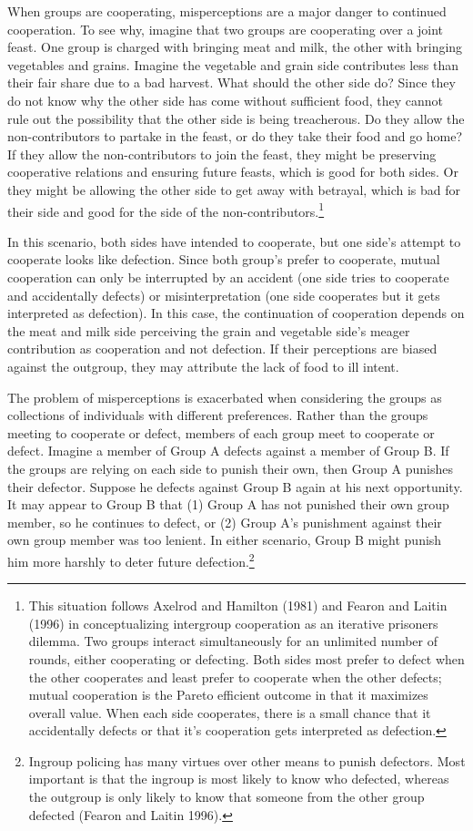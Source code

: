 \documentclass[11pt]{article}
\begin{document}
When groups are cooperating, misperceptions are a major danger to
continued cooperation. To see why, imagine that two groups are
cooperating over a joint feast. One group is charged with bringing meat
and milk, the other with bringing vegetables and grains. Imagine the
vegetable and grain side contributes less than their fair share due to a
bad harvest. What should the other side do? Since they do not know why
the other side has come without sufficient food, they cannot rule out
the possibility that the other side is being treacherous. Do they allow
the non-contributors to partake in the feast, or do they take their food
and go home? If they allow the non-contributors to join the feast, they
might be preserving cooperative relations and ensuring future feasts,
which is good for both sides. Or they might be allowing the other side
to get away with betrayal, which is bad for their side and good for the
side of the non-contributors.\footnote{This situation follows Axelrod
  and Hamilton (1981) and Fearon and Laitin (1996) in conceptualizing
  intergroup cooperation as an iterative prisoners dilemma. Two groups
  interact simultaneously for an unlimited number of rounds, either
  cooperating or defecting. Both sides most prefer to defect when the
  other cooperates and least prefer to cooperate when the other defects;
  mutual cooperation is the Pareto efficient outcome in that it
  maximizes overall value. When each side cooperates, there is a small
  chance that it accidentally defects or that it's cooperation gets
  interpreted as defection.}

In this scenario, both sides have intended to cooperate, but one side's
attempt to cooperate looks like defection. Since both group's prefer to
cooperate, mutual cooperation can only be interrupted by an accident
(one side tries to cooperate and accidentally defects) or
misinterpretation (one side cooperates but it gets interpreted as
defection). In this case, the continuation of cooperation depends on the
meat and milk side perceiving the grain and vegetable side's meager
contribution as cooperation and not defection. If their perceptions are
biased against the outgroup, they may attribute the lack of food to ill
intent.

The problem of misperceptions is exacerbated when considering the groups
as collections of individuals with different preferences. Rather than
the groups meeting to cooperate or defect, members of each group meet to
cooperate or defect. Imagine a member of Group A defects against a
member of Group B. If the groups are relying on each side to punish
their own, then Group A punishes their defector. Suppose he defects
against Group B again at his next opportunity. It may appear to Group B
that (1) Group A has not punished their own group member, so he
continues to defect, or (2) Group A's punishment against their own group
member was too lenient. In either scenario, Group B might punish him
more harshly to deter future defection.\footnote{Ingroup policing has
  many virtues over other means to punish defectors. Most important is
  that the ingroup is most likely to know who defected, whereas the
  outgroup is only likely to know that someone from the other group
  defected (Fearon and Laitin 1996).}
\end{document}
